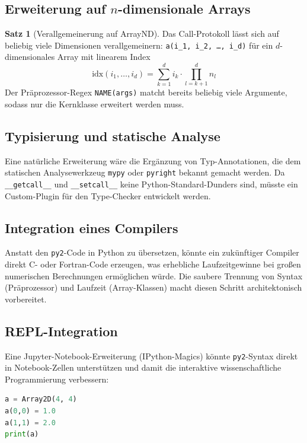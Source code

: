 ﻿\documentclass[a4paper,12pt]{article}
\theoremstyle{definition}
\newtheorem{satz}{Satz}
\begin{document}
\subsection{Erweiterung auf $n$-dimensionale Arrays}

\begin{satz}[Verallgemeinerung auf ArrayND]
	Das Call-Protokoll l\"asst sich auf beliebig viele Dimensionen verallgemeinern:
	\texttt{a(i\_1, i\_2, \ldots, i\_d)} f\"ur ein $d$-dimensionales Array mit
	linearem Index
	\[
		\text{idx}(i_1, \ldots, i_d) = \sum_{k=1}^{d} i_k \cdot \prod_{l=k+1}^{d} n_l
	\]
	Der Pr\"aprozessor-Regex \texttt{NAME(args)} matcht bereits beliebig viele
	Argumente, sodass nur die Kernklasse erweitert werden muss.
\end{satz}

\subsection{Typisierung und statische Analyse}

Eine nat\"urliche Erweiterung w\"are die Erg\"anzung von Typ-Annotationen, die dem
statischen Analysewerkzeug \texttt{mypy} oder \texttt{pyright} bekannt gemacht werden.
Da \texttt{\_\_getcall\_\_} und \texttt{\_\_setcall\_\_} keine Python-Standard-Dunders
sind, m\"usste ein Custom-Plugin f\"ur den Type-Checker entwickelt werden.

\subsection{Integration eines Compilers}

Anstatt den \texttt{py2}-Code in Python zu \"ubersetzen, k\"onnte ein zuk\"unftiger
Compiler direkt C- oder Fortran-Code erzeugen, was erhebliche Laufzeitgewinne
bei gro\ss{}en numerischen Berechnungen erm\"oglichen w\"urde. Die saubere Trennung
von Syntax (Pr\"aprozessor) und Laufzeit (Array-Klassen) macht diesen Schritt
architektonisch vorbereitet.

\subsection{REPL-Integration}

Eine Jupyter-Notebook-Erweiterung (IPython-Magics) k\"onnte \texttt{py2}-Syntax
direkt in Note\-book-Zellen unterst\"utzen und damit die interaktive wissenschaftliche
Programmierung verbessern:

\begin{lstlisting}[language=Python, caption={Hypothetische Jupyter-Integration}]
%%py2
a = Array2D(4, 4)
a(0,0) = 1.0
a(1,1) = 2.0
print(a)
\end{lstlisting}
\end{document}
